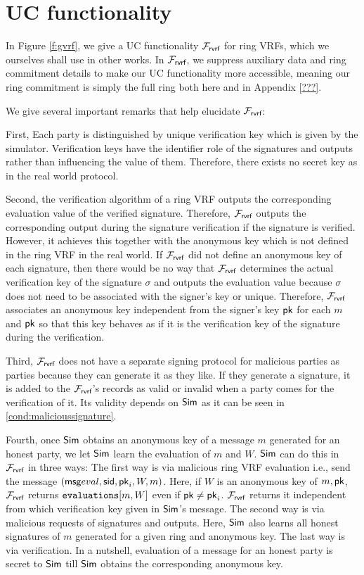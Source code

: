 \section{UC functionality}

In Figure \ref{f:gvrf}, we give a UC functionality $\mathcal{F}_{\textsf{rvrf}}$ for ring VRFs,
which we ourselves shall use in other works.  In $\mathcal{F}_{\textsf{rvrf}}$, we suppress
auxiliary data and ring commitment details to make our UC functionality
more accessible, meaning our ring commitment is simply the full ring both
here and in Appendix \ref{???}.

We give several important remarks that help elucidate $\mathcal{F}_{\textsf{rvrf}}$:

First, Each party is distinguished by unique verification key which is given by the simulator. Verification keys have the identifier role of  the signatures and outputs rather than  influencing the value of them. Therefore, there exists no secret key as in the real world protocol.

Second, the verification algorithm of a ring VRF outputs the corresponding evaluation value of the verified signature. Therefore, $ \mathcal{F}_{\textsf{rvrf}} $  outputs the corresponding output during the signature verification if the signature is verified. However, it achieves this together with the anonymous key which is not defined in the ring VRF in the real world.  If $ \mathcal{F}_{\textsf{rvrf}} $ did not define an anonymous key of each signature, then there would be no way that $ \mathcal{F}_{\textsf{rvrf}} $ determines the actual verification key of the signature $ \sigma $ and outputs the evaluation value because $ \sigma $ does not need to be associated with the signer's key or unique. Therefore, $ \mathcal{F}_{\textsf{rvrf}} $ associates an anonymous key independent from the signer's key $ \mathsf{pk} $ for each $ m $ and $ \mathsf{pk} $ so that this key behaves as if it is the verification key of the signature during the verification.
	
Third, $ \mathcal{F}_{\textsf{rvrf}} $ does not have a separate signing protocol for malicious parties as parties because they can generate it as they like. If they generate a signature, it is added to the $ \mathcal{F}_{\textsf{rvrf}} $'s records as valid or invalid when a party comes for the verification of it.  Its validity depends on $ \mathsf{Sim} $ as it can be seen in \ref{cond:malicioussignature}. 
	
Fourth, once $ \mathsf{Sim} $ obtains an anonymous key of a message $ m $ generated for an honest party, we let $ \mathsf{Sim} $ learn the  evaluation of  $ m $ and  $ W $. $ \mathsf{Sim} $ can do this in $ \mathcal{F}_{\textsf{rvrf}} $ in three ways: The first way is via malicious ring VRF evaluation i.e., send the message $ (\mathsf{msg}{eval}, \textsf{sid}, \mathsf{pk}_i,W,m) $. Here, if $ W $ is an anonymous key of $ m, \mathsf{pk}  $, $ \mathcal{F}_{\textsf{rvrf}} $ returns $ \texttt{evaluations}[m, W] $ even if $ \mathsf{pk} \neq \mathsf{pk}_i $. $ \mathcal{F}_{\textsf{rvrf}} $ returns it independent from which verification key given in $ \mathsf{Sim} $'s message. The second way is via malicious requests of signatures and outputs.  Here, $ \mathsf{Sim} $ also learns  all honest signatures of $ m $ generated for a given ring and anonymous key. The last way is via verification.  In a nutshell, evaluation of a message for an honest party is secret to $ \mathsf{Sim} $ till $ \mathsf{Sim} $ obtains the corresponding anonymous key.
	
